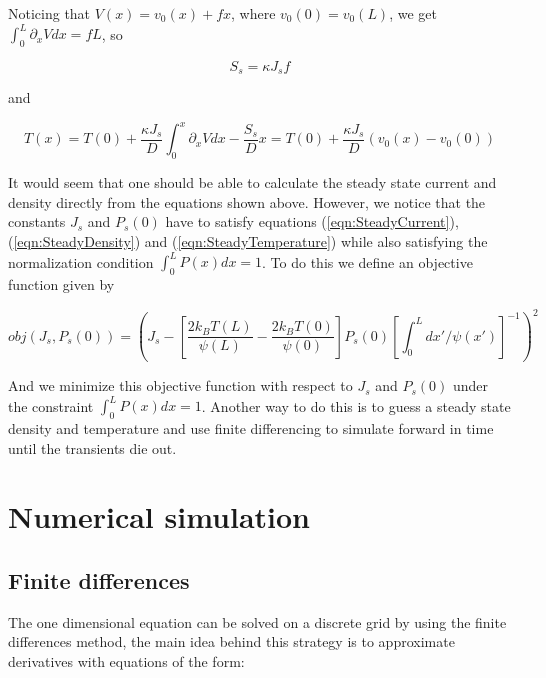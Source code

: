 Noticing that $V(x) = v_0(x) + f x$, where $v_0(0) = v_0(L)$, we get $\int_0^L \partial_x V dx = f L$, so

\begin{equation}
S_s = \kappa J_s f
\end{equation}

and

\begin{equation}
T(x) = T(0) + \frac{\kappa J_s}{D} \int_0^x \partial_x V dx - \frac{S_s}{D}x = T(0) + \frac{\kappa J_s}{D} (v_0(x) - v_0(0)) \label{eqn:SteadyTemperature}
\end{equation}

It would seem that one should be able to calculate the steady state current and density directly from the equations shown above. However, we notice that the constants $J_s$ and $P_s(0)$ have to satisfy equations (\ref{eqn:SteadyCurrent}), (\ref{eqn:SteadyDensity}) and (\ref{eqn:SteadyTemperature}) while also satisfying the normalization condition $\int_0^L P(x) dx = 1$. To do this we define an objective function given by

\begin{equation}
obj(J_s, P_s(0)) = \left (J_s - \left [\frac{2 k_B T(L)}{\psi(L)} - \frac{2 k_B T(0)}{\psi(0)}  \right] P_s(0) \left [\int_0^L dx'/\psi(x') \right]^{-1} \right)^2  \label{eqn:Objective}
\end{equation}

And we minimize this objective function with respect to $J_s$ and $P_s(0)$ under the constraint $\int_0^L P(x) dx = 1$. Another way to do this is to guess a steady state density and temperature and use finite differencing to simulate forward in time until the transients die out.


\section{Numerical simulation} \label{numerics}

\subsection{Finite differences}
The one dimensional equation can be solved on a discrete grid by using the finite differences method, the main idea behind this strategy is to approximate derivatives with equations of the form:

